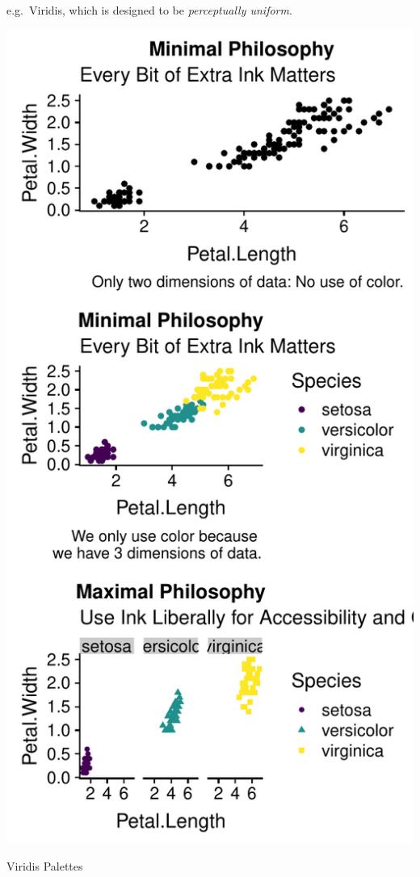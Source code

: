 \documentclass[]{tufte-handout}
\begin{document}
e.g.~Viridis, which is designed to be \emph{perceptually uniform}.

\begin{marginfigure}
\includegraphics{design_files/figure-latex/unnamed-chunk-8-1} \caption[Viridis Palettes]{Viridis Palettes}\label{fig:unnamed-chunk-8}
\end{marginfigure}
\end{document}
